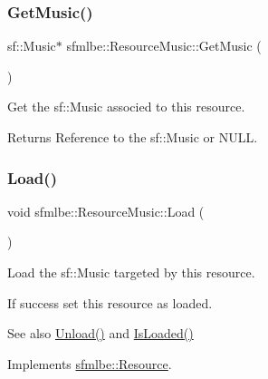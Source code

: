 \subsubsection{\texorpdfstring{Get\+Music()}{GetMusic()}}
{\footnotesize\ttfamily sf\+::\+Music$\ast$ sfmlbe\+::\+Resource\+Music\+::\+Get\+Music (\begin{DoxyParamCaption}{ }\end{DoxyParamCaption})\hspace{0.3cm}{\ttfamily [inline]}}



Get the sf\+::\+Music associed to this resource. 

\begin{DoxyReturn}{Returns}
Reference to the sf\+::\+Music or N\+U\+LL. 
\end{DoxyReturn}
\mbox{\label{classsfmlbe_1_1_resource_music_a8d612eff1f1f8847c2b96a616456e558}} 
\subsubsection{\texorpdfstring{Load()}{Load()}}
{\footnotesize\ttfamily void sfmlbe\+::\+Resource\+Music\+::\+Load (\begin{DoxyParamCaption}{ }\end{DoxyParamCaption})\hspace{0.3cm}{\ttfamily [virtual]}}



Load the sf\+::\+Music targeted by this resource. 

If success set this resource as loaded. \begin{DoxySeeAlso}{See also}
\mbox{\hyperlink{classsfmlbe_1_1_resource_music_a5697430030c12a5850f317147feb059f}{Unload()}} and \mbox{\hyperlink{classsfmlbe_1_1_resource_acd0812c81f7d5d851a4671f0cf7bb4f1}{Is\+Loaded()}} 
\end{DoxySeeAlso}


Implements \mbox{\hyperlink{classsfmlbe_1_1_resource_a35981869a1e90ebbf30258ff7aa1d6d2}{sfmlbe\+::\+Resource}}.

\mbox{\label{classsfmlbe_1_1_resource_music_a5697430030c12a5850f317147feb059f}} 
